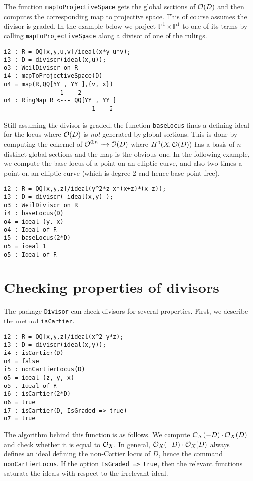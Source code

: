 \documentclass[11pt]{amsart}
\begin{document}
The function {\tt mapToProjectiveSpace} gets the global sections of $\mbox{$\mathcal{O}$}(D)$ and then computes the corresponding map to projective space.  This of course assumes the divisor is graded.  In the example below we project $\mathbb{P}^1 \times \mathbb{P}^1$ to one of its terms by calling {\tt mapToProjectiveSpace} along a divisor of one of the rulings.
\begin{verbatim}
i2 : R = QQ[x,y,u,v]/ideal(x*y-u*v);
i3 : D = divisor(ideal(x,u));
o3 : WeilDivisor on R
i4 : mapToProjectiveSpace(D)
o4 = map(R,QQ[YY , YY ],{v, x})
                1    2
o4 : RingMap R <--- QQ[YY , YY ]
                         1    2
\end{verbatim}

Still assuming the divisor is graded, the function {\tt baseLocus} finds a defining ideal for the locus where $\mbox{$\mathcal{O}$}(D)$ is \emph{not} generated by global sections.  This is done by computing the cokernel of $\mbox{$\mathcal{O}$}^{\oplus n} \xrightarrow{\ \ } \mbox{$\mathcal{O}$}(D)$ where $H^0(X, \mbox{$\mathcal{O}$}(D))$ has a basis of $n$ distinct global sections and the map is the obvious one.  In the following example, we compute the base locus of a point on an elliptic curve, and also two times a point on an elliptic curve (which is degree 2 and hence base point free).
\begin{verbatim}
i2 : R = QQ[x,y,z]/ideal(y^2*z-x*(x+z)*(x-z));
i3 : D = divisor( ideal(x,y) );
o3 : WeilDivisor on R
i4 : baseLocus(D)
o4 = ideal (y, x)
o4 : Ideal of R
i5 : baseLocus(2*D)
o5 = ideal 1
o5 : Ideal of R
\end{verbatim}

\section{Checking properties of divisors}
\label{sec.Checks}

The package {\tt Divisor} can check divisors for several properties.  First, we describe the method {\tt isCartier}.
\begin{verbatim}
i2 : R = QQ[x,y,z]/ideal(x^2-y*z);
i3 : D = divisor(ideal(x,y));
i4 : isCartier(D)
o4 = false
i5 : nonCartierLocus(D)
o5 = ideal (z, y, x)
o5 : Ideal of R
i6 : isCartier(2*D)
o6 = true
i7 : isCartier(D, IsGraded => true)
o7 = true
\end{verbatim}
The algorithm behind this function is as follows.  We compute $\mbox{$\mathcal{O}$}_X(-D) \cdot \mbox{$\mathcal{O}$}_X(D)$ and check whether it is equal to $\mbox{$\mathcal{O}$}_X$.  In general, $\mbox{$\mathcal{O}$}_X(-D) \cdot \mbox{$\mathcal{O}$}_X(D)$ always defines an ideal defining the non-Cartier locus of $D$, hence the command {\tt nonCartierLocus}.  If the option {\tt IsGraded => true}, then the relevant functions saturate the ideals with respect to the irrelevant ideal.
\end{document}
